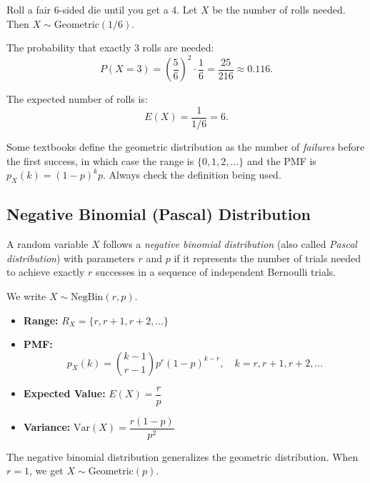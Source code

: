 \begin{eg}
Roll a fair 6-sided die until you get a 4. Let \(X\) be the number of rolls needed. Then \(X \sim \text{Geometric}(1/6)\).

The probability that exactly 3 rolls are needed:
\[
P(X = 3) = \left(\frac{5}{6}\right)^2 \cdot \frac{1}{6} = \frac{25}{216} \approx 0.116.
\]

The expected number of rolls is:
\[
E(X) = \frac{1}{1/6} = 6.
\]
\end{eg}

\begin{remark}
Some textbooks define the geometric distribution as the number of \emph{failures} before the first success, in which case the range is \(\{0, 1, 2, \ldots\}\) and the PMF is \(p_X(k) = (1-p)^k p\). Always check the definition being used.
\end{remark}

\subsection{Negative Binomial (Pascal) Distribution}

\begin{definition}
A random variable \(X\) follows a \emph{negative binomial distribution} (also called \emph{Pascal distribution}) with parameters \(r\) and \(p\) if it represents the number of trials needed to achieve exactly \(r\) successes in a sequence of independent Bernoulli trials.

We write \(X \sim \text{NegBin}(r, p)\).
\end{definition}

\begin{itemize}
    \item \textbf{Range:} \(R_X = \{r, r+1, r+2, \ldots\}\)
    
    \item \textbf{PMF:}
    \[
    p_X(k) = \binom{k-1}{r-1} p^r (1-p)^{k-r}, \quad k = r, r+1, r+2, \ldots
    \]
    
    \item \textbf{Expected Value:} \(E(X) = \dfrac{r}{p}\)
    
    \item \textbf{Variance:} \(\text{Var}(X) = \dfrac{r(1-p)}{p^2}\)
\end{itemize}

\begin{remark}
The negative binomial distribution generalizes the geometric distribution. When \(r = 1\), we get \(X \sim \text{Geometric}(p)\).
\end{remark}

